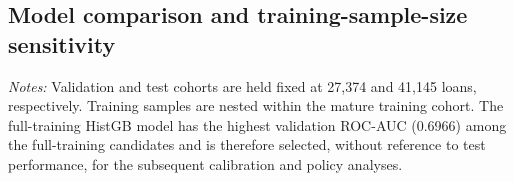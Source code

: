 \documentclass[10pt]{article}
\begin{document}
\subsection{Model comparison and training-sample-size sensitivity}
\label{sec:modelcomparison}


\begin{table}[!ht]
\centering
\caption{Training-sample-size sensitivity on the fixed outcome-mature validation and test cohorts. Lower Brier score and log loss indicate better probability quality.}
\label{tab:training_size}
\vspace{3pt}

{\footnotesize \textit{Notes:} Validation and test cohorts are held fixed at 27,374 and 41,145 loans, respectively. Training samples are nested within the mature training cohort. The full-training HistGB model has the highest validation ROC-AUC (0.6966) among the full-training candidates and is therefore selected, without reference to test performance, for the subsequent calibration and policy analyses.}
\end{table}
\end{document}

